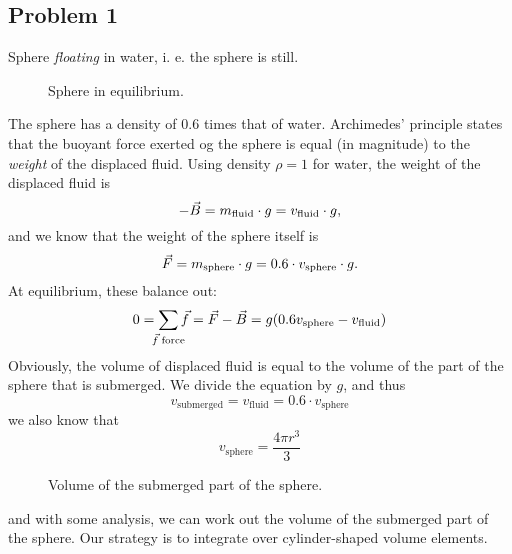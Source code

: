 \documentclass[12pt]{article}
\begin{document}
\begin{multicols}{2}

\section*{Problem 1}
Sphere {\em floating} in water, i. e. the sphere is still.
\begin{figure}[H]
\centering

\caption{
    Sphere in equilibrium.
}
\label{fig:kule}
\end{figure}
\noindent
The sphere has a density of $0.6$ times that of water.
Archimedes' principle states that the buoyant force exerted
og the sphere is equal (in magnitude) to the {\em weight} of the displaced fluid.
Using density $\rho = 1$ for water, the weight of the displaced fluid is
\[
    -\vec{B} = m_{\text{fluid}} \cdot g = v_{\text{fluid}} \cdot g \text,
\]
and we know that the weight of the sphere itself is
\[
    \vec{F} = m_{\text{sphere}} \cdot g = 0.6 \cdot v_{\text{sphere}} \cdot g \text.
\]
At equilibrium, these balance out:
\[
    0 = \sum_{\mathclap{\vec f \; \text{force}}} \vec{f} = \vec F - \vec B
        = g(0.6v_\text{sphere} - v_\text{fluid})
\]
Obviously, the volume of displaced fluid is equal to the volume of the
part of the sphere that is submerged.
We divide the equation by $g$, and thus
\begin{equation}
    v_\text{submerged} = v_\text{fluid} = 0.6 \cdot v_\text{sphere}
\end{equation}
we also know that
\begin{equation}
    v_\text{sphere} = \frac{4\pi r^3}{3}
\end{equation}
\begin{figure}[H]
\centering

\caption{
    Volume of the submerged part of the sphere.
}
\label{fig:sub}
\end{figure}
\noindent
and with some analysis, we can work out the volume of the submerged
part of the sphere. Our strategy is to integrate over
cylinder-shaped volume elements.


\end{multicols}
\end{document}
